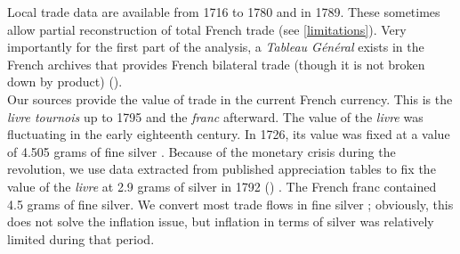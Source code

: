 \documentclass[12pt,a4paper,notitlepage,english]{article}
\begin{document}
Local trade data are available from 1716 to 1780 and in 1789. These sometimes allow partial reconstruction of total French trade (see \ref{limitations}).
Very importantly for the first part of the analysis, a \textit{Tableau Général} exists in the French archives that provides French bilateral trade (though it is not broken down by product) (\cite{romano1957documenti}). \\
Our sources provide the value of trade in the current French currency. This is the \textit{livre tournois} up to 1795 and the \textit{franc} afterward. The value of the \textit{livre} was fluctuating in the early eighteenth century. In 1726, its value was fixed at a value of 4.505 grams of fine silver \citep{de_wailly_memoire_1857}. Because of the monetary crisis during the revolution, we use data extracted from published appreciation tables to fix the value of the \textit{livre} at 2.9 grams of silver in 1792 (\cite{hoffman_priceless_2000}) . The French franc contained 4.5 grams of fine silver. We convert most trade flows in fine silver ; obviously, this does not solve the inflation issue, but inflation in terms of silver was relatively limited during that period.
\end{document}
